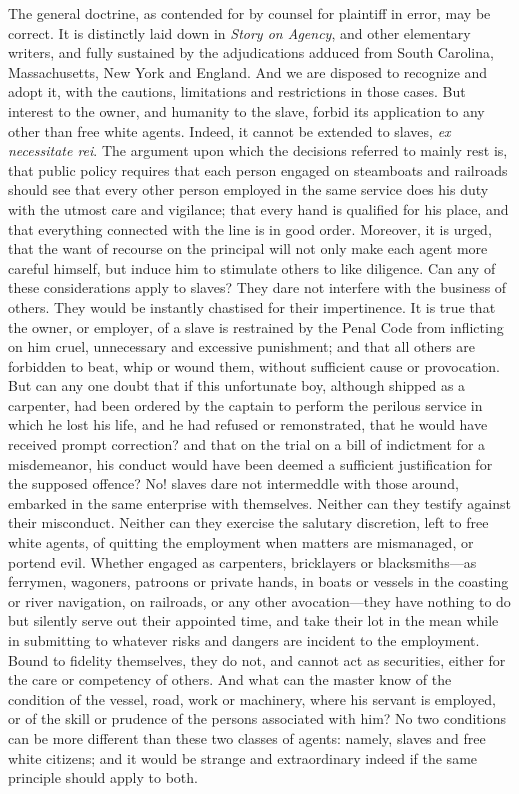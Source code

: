 \documentclass[
  letterpaper,
  11pt,
  DIV=9,
  openright]{scrbook}
\begin{document}
The general doctrine, as contended for by counsel for plaintiff in
error, may be correct. It is distinctly laid down in \emph{Story on
Agency}, and other elementary writers, and fully sustained by the
adjudications adduced from South Carolina, Massachusetts, New York and
England. And we are disposed to recognize and adopt it, with the
cautions, limitations and restrictions in those cases. But interest to
the owner, and humanity to the slave, forbid its application to any
other than free white agents. Indeed, it cannot be extended to slaves,
\emph{ex necessitate rei}. The argument upon which the decisions
referred to mainly rest is, that public policy requires that each person
engaged on steamboats and railroads should see that every other person
employed in the same service does his duty with the utmost care and
vigilance; that every hand is qualified for his place, and that
everything connected with the line is in good order. Moreover, it is
urged, that the want of recourse on the principal will not only make
each agent more careful himself, but induce him to stimulate others to
like diligence. Can any of these considerations apply to slaves? They
dare not interfere with the business of others. They would be instantly
chastised for their impertinence. It is true that the owner, or
employer, of a slave is restrained by the Penal Code from inflicting on
him cruel, unnecessary and excessive punishment; and that all others are
forbidden to beat, whip or wound them, without sufficient cause or
provocation. But can any one doubt that if this unfortunate boy,
although shipped as a carpenter, had been ordered by the captain to
perform the perilous service in which he lost his life, and he had
refused or remonstrated, that he would have received prompt correction?
and that on the trial on a bill of indictment for a misdemeanor, his
conduct would have been deemed a sufficient justification for the
supposed offence? No! slaves dare not intermeddle with those around,
embarked in the same enterprise with themselves. Neither can they
testify against their misconduct. Neither can they exercise the salutary
discretion, left to free white agents, of quitting the employment when
matters are mismanaged, or portend evil. Whether engaged as carpenters,
bricklayers or blacksmiths---as ferrymen, wagoners, patroons or private
hands, in boats or vessels in the coasting or river navigation, on
railroads, or any other avocation---they have nothing to do but silently
serve out their appointed time, and take their lot in the mean while in
submitting to whatever risks and dangers are incident to the employment.
Bound to fidelity themselves, they do not, and cannot act as securities,
either for the care or competency of others. And what can the master
know of the condition of the vessel, road, work or machinery, where his
servant is employed, or of the skill or prudence of the persons
associated with him? No two conditions can be more different than these
two classes of agents: namely, slaves and free white citizens; and it
would be strange and extraordinary indeed if the same principle should
apply to both.
\end{document}
